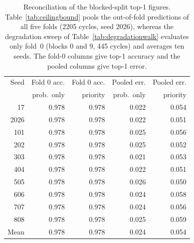 \begin{table}[t]
\centering
\caption{Reconciliation of the blocked-split top-1 figures. Table~\ref{tab:ceilingbound} pools the out-of-fold predictions of all five folds (2205 cycles, seed 2026), whereas the degradation sweep of Table~\ref{tab:degradationwalk} evaluates only fold~0 (blocks 0 and 9, 445 cycles) and averages ten seeds. The fold-0 columns give top-1 accuracy and the pooled columns give top-1 error.}
\label{tab:reconcile}
\footnotesize
\setlength{\tabcolsep}{3pt}
\begin{tabular}{rrrrr}
\toprule
Seed & Fold 0 acc. & Fold 0 acc. & Pooled err. & Pooled err. \\
 & prob.\ only & priority & prob.\ only & priority \\
\midrule
17 & 0.978 & 0.978 & 0.022 & 0.054 \\
2026 & 0.978 & 0.978 & 0.022 & 0.051 \\
101 & 0.978 & 0.978 & 0.025 & 0.056 \\
202 & 0.978 & 0.978 & 0.025 & 0.052 \\
303 & 0.978 & 0.978 & 0.021 & 0.053 \\
404 & 0.978 & 0.978 & 0.022 & 0.051 \\
505 & 0.978 & 0.978 & 0.026 & 0.050 \\
606 & 0.978 & 0.978 & 0.024 & 0.058 \\
707 & 0.978 & 0.978 & 0.024 & 0.056 \\
808 & 0.978 & 0.978 & 0.025 & 0.059 \\
\midrule
Mean & 0.978 & 0.978 & 0.024 & 0.054 \\
\bottomrule
\end{tabular}
\end{table}
